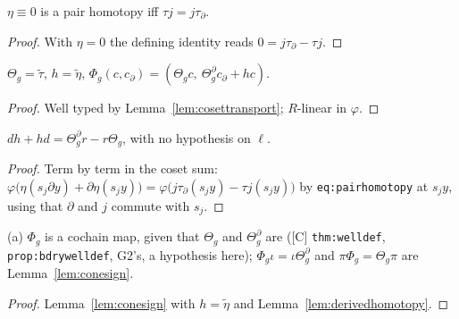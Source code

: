 \begin{lemma}[Strictness]\label{thm:conewelldef-d}
  \leanok
  $\eta\equiv0$ is a pair homotopy iff $\tau j=j\tau_\partial$.
\end{lemma}
\begin{proof}
  \leanok
  With $\eta=0$ the defining identity reads $0=j\tau_\partial-\tau j$.
\end{proof}

\begin{definition}\label{def:coneaction}
  \leanok
  $\Theta_g=\widetilde\tau$, $h=\widetilde\eta$, $\Phi_g(c,c_\partial)=(\Theta_gc,\ \Theta^\partial_gc_\partial+hc)$.
\end{definition}
\begin{proof}
  \leanok
  Well typed by Lemma~\ref{lem:cosettransport}; $R$-linear in $\varphi$.
\end{proof}

\begin{lemma}\label{lem:derivedhomotopy}
  \leanok
  $dh+hd=\Theta^\partial_g r-r\Theta_g$, with no hypothesis on $\ell$.
\end{lemma}
\begin{proof}
  \leanok
  Term by term in the coset sum: $\varphi\bigl(\eta(s_j\partial y)+\partial\eta(s_jy)\bigr)=\varphi\bigl(j\tau_\partial(s_jy)-\tau j(s_jy)\bigr)$ by
  \texttt{eq:pairhomotopy} at $s_jy$, using that $\partial$ and $j$ commute with $s_j$.
\end{proof}

\begin{theorem}\label{thm:conewelldef}
  \leanok
  (a) $\Phi_g$ is a cochain map, given that $\Theta_g$ and $\Theta^\partial_g$ are ([C] \texttt{thm:welldef},
  \texttt{prop:bdrywelldef}, G2's, a hypothesis here); $\Phi_g\iota=\iota\Theta^\partial_g$ and $\pi\Phi_g=\Theta_g\pi$ are
  Lemma~\ref{lem:conesign}.
\end{theorem}
\begin{proof}
  \leanok
  Lemma~\ref{lem:conesign} with $h=\widetilde\eta$ and Lemma~\ref{lem:derivedhomotopy}.
\end{proof}

